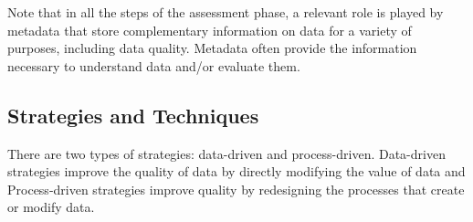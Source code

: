 \documentclass[pdftex,english,oribibl]{llncs}
\begin{document}
\begin{comment}
(6) Design of Data Improvement Solutions, which selects the most effective and efficient strategy and related set of techniques and tools to improve data quality;
(7) Process Control, which defines check points in the data production processes, to monitor quality during process execution;
(8) Process Redesign, which defines the process improvement actions that can deliver corresponding DQ improvements;
(9) Improvement Management, which defines new organizational rules for data quality;
(10) Improvement Monitoring, which establishes periodic monitoring activities that provide feedback on the results of the improvement process and enables its dynamic tuning.
\end{comment}
Note that in all the steps of the assessment phase, a relevant role is played by metadata that store complementary information on data for a variety of purposes, including data quality. Metadata often provide the information necessary to understand data and/or evaluate them.

\subsection{Strategies and Techniques}
There are two types of strategies: data-driven and process-driven. Data-driven strategies improve the quality of data by directly modifying the value of data and Process-driven strategies improve quality by redesigning the processes that create or modify data.
\end{document}
